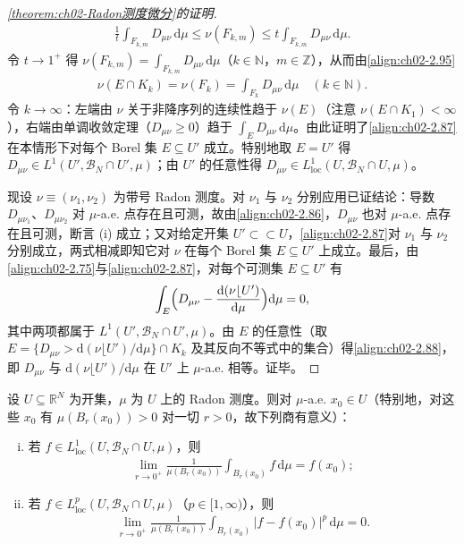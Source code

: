 \documentclass[../../main.tex]{subfiles}%
\begin{document}
\begin{proof}[\cref{theorem:ch02-Radon测度微分}的证明]
\begin{align*}
\frac1t\int_{F_{k,m}}D_{\mu\nu}\,\mathrm{d}\mu\leqslant\nu(F_{k,m})\leqslant t\int_{F_{k,m}}D_{\mu\nu}\,\mathrm{d}\mu.
\end{align*}
令 $t\to1^+$ 得 $\nu(F_{k,m})=\int_{F_{k,m}}D_{\mu\nu}\,\mathrm{d}\mu$（$k\in\mathbb{N}$，$m\in\mathbb{Z}$），从而由\eqref{align:ch02-2.95}
\begin{align*}
\nu(E\cap K_k)=\nu(F_k)=\int_{F_k}D_{\mu\nu}\,\mathrm{d}\mu\quad(k\in\mathbb{N}).
\end{align*}
令 $k\to\infty$：左端由 $\nu$ 关于非降序列的连续性趋于 $\nu(E)$（注意 $\nu(E\cap K_1)<\infty$），右端由单调收敛定理（$D_{\mu\nu}\geqslant0$）趋于 $\int_ED_{\mu\nu}\,\mathrm{d}\mu$。由此证明了\eqref{align:ch02-2.87}在本情形下对每个 Borel 集 $E\subseteq U'$ 成立。特别地取 $E=U'$ 得 $D_{\mu\nu}\in L^1(U',\mathscr B_N\cap U',\mu)$；由 $U'$ 的任意性得 $D_{\mu\nu}\in L^1_{\mathrm{loc}}(U,\mathscr B_N\cap U,\mu)$。

现设 $\nu\equiv(\nu_1,\nu_2)$ 为带号 Radon 测度。对 $\nu_1$ 与 $\nu_2$ 分别应用已证结论：导数 $D_{\mu\nu_1}$、$D_{\mu\nu_2}$ 对 $\mu$-a.e. 点存在且可测，故由\eqref{align:ch02-2.86}，$D_{\mu\nu}$ 也对 $\mu$-a.e. 点存在且可测，断言 (i) 成立；又对给定开集 $U'\subset\subset U$，\eqref{align:ch02-2.87}对 $\nu_1$ 与 $\nu_2$ 分别成立，两式相减即知它对 $\nu$ 在每个 Borel 集 $E\subseteq U'$ 上成立。最后，由\eqref{align:ch02-2.75}与\eqref{align:ch02-2.87}，对每个可测集 $E\subseteq U'$ 有
\begin{align*}
\int_E\Bigl(D_{\mu\nu}-\frac{\mathrm{d}(\nu\lfloor U')}{\mathrm{d}\mu}\Bigr)\mathrm{d}\mu=0,
\end{align*}
其中两项都属于 $L^1(U',\mathscr B_N\cap U',\mu)$。由 $E$ 的任意性（取 $E=\{D_{\mu\nu}>\mathrm{d}(\nu\lfloor U')/\mathrm{d}\mu\}\cap K_k$ 及其反向不等式中的集合）得\eqref{align:ch02-2.88}，即 $D_{\mu\nu}$ 与 $\mathrm{d}(\nu\lfloor U')/\mathrm{d}\mu$ 在 $U'$ 上 $\mu$-a.e. 相等。证毕。
\end{proof}


\begin{corollary}\label{corollary:ch02-Lebesgue点}\label{corollary:ch02-Lebesgue微分}
设 $U\subseteq\mathbb R^N$ 为开集，$\mu$ 为 $U$ 上的 Radon 测度。则对 $\mu$-a.e. $x_0\in U$（特别地，对这些 $x_0$ 有 $\mu(B_r(x_0))>0$ 对一切 $r>0$，故下列商有意义）：
\begin{enumerate}[(i)]
\item 若 $f\in L^1_{\mathrm{loc}}(U,\mathscr B_N\cap U,\mu)$，则
\begin{align}
\lim_{r\to0^+}\frac{1}{\mu(B_r(x_0))}\int_{B_r(x_0)}f\,\mathrm{d}\mu=f(x_0); \label{align:ch02-2.96}
\end{align}
\item 若 $f\in L^p_{\mathrm{loc}}(U,\mathscr B_N\cap U,\mu)$（$p\in[1,\infty)$），则
\begin{align}
\lim_{r\to0^+}\frac{1}{\mu(B_r(x_0))}\int_{B_r(x_0)}|f-f(x_0)|^p\,\mathrm{d}\mu=0. \label{align:ch02-2.97}
\end{align}
\end{enumerate}
\end{corollary}
\end{document}
